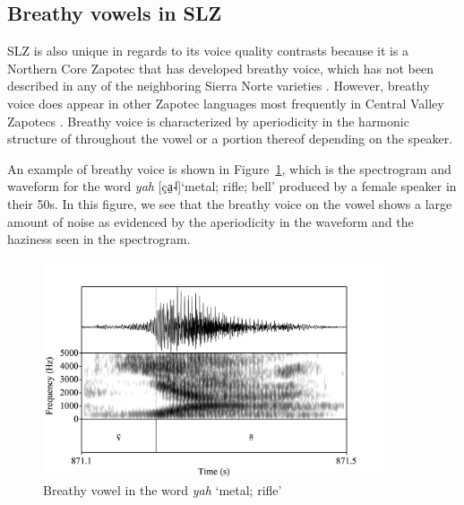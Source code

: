 \subsection{Breathy vowels in SLZ} \label{sec:SLZ-voicequality-breathy}
SLZ is also unique in regards to its voice quality contrasts because it is a Northern Core Zapotec that has developed breathy voice, which has not been described in any of the neighboring Sierra Norte varieties \citep{nellisFortisLenisCajonos1980,jaegerInitialConsonantClusters1982,butlerh.DiccionarioZapotecoYatzachi1997,avelinoTopicsYalalagZapotec2004,sonnenscheinDescriptiveGrammarSan2005,longDiccionarioZapotecoSan2005}. However, breathy voice does appear in other Zapotec languages most frequently in Central Valley Zapotecs \citep{munroDicsyonaaryTeenDiizh1999,espositoSantaAnaValle2004,espositoVariationContrastivePhonation2010,uchiharaToneRegistrogenesisQuiavini2016,ariza-garciaPhonationTypesTones2018}. Breathy voice is characterized by aperiodicity in the harmonic structure of throughout the vowel or a portion thereof depending on the speaker. 

An example of breathy voice is shown in Figure~\ref{fig:BreathyVowel}, which is the spectrogram and waveform for the word \textit{yah} [ça̤˨]`metal; rifle; bell' produced by a female speaker in their 50s. In this figure, we see that the breathy voice on the vowel shows a large amount of noise as evidenced by the aperiodicity in the waveform and the haziness seen in the spectrogram.

\begin{figure}[h!]
    \centering
    \includegraphics[width=0.9\textwidth]{images/Spectrograms/yah.png}
    \caption{Breathy vowel in the word \textit{yah} `metal; rifle'}
    \label{fig:BreathyVowel}
\end{figure}

